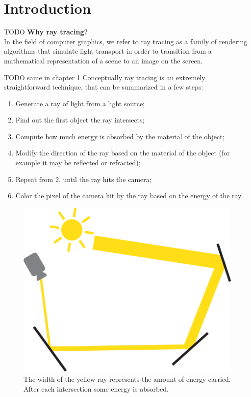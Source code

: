 \documentclass{PoliMi_MasterThesis}
\begin{document}
\chapter*{Introduction}
\iffalse TODO
\large \textbf{Why ray tracing?} \normalsize\\
In the field of computer graphics, we refer to ray tracing as a family of rendering algorithms that simulate light transport in order to transition from a mathematical representation of a scene to an image on the screen. 

TODO same in chapter 1
Conceptually ray tracing is an extremely straightforward technique, that can be summarized in a few steps:
\begin{enumerate}
\item Generate a ray of light from a light source;
\item Find out the first object the ray intersects;
\item Compute how much energy is absorbed by the material of the object;
\item Modify the direction of the ray based on the material of the object (for example it may be reflected or refracted);
\item Repeat from 2. until the ray hits the camera;
\item Color the pixel of the camera hit by the ray based on the energy of the ray.
\end{enumerate}

\begin{figure}[H]
    \centering
    \includegraphics[scale=0.4]{Images/ray_tracing_simple.png}
    \caption{The width of the yellow ray represents the amount of energy carried. After each intersection some energy is absorbed.}
    \label{fig:ray_tracing_simple}
\end{figure}
\end{document}
